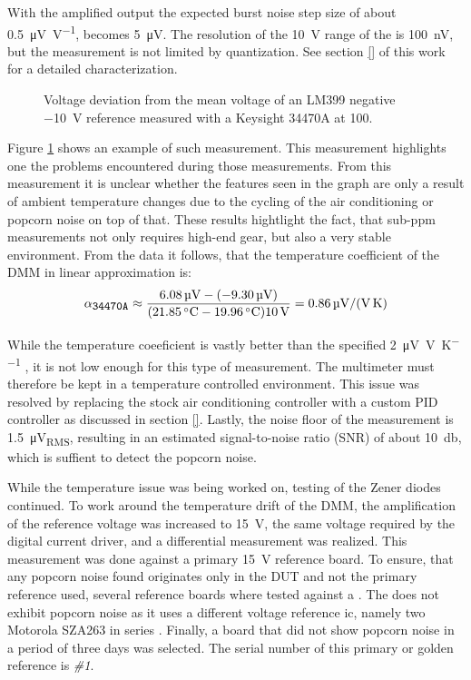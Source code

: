 With the amplified output the expected burst noise step size of about \qty[per-mode=symbol]{0.5}{\micro\volt \per \volt}, becomes \qty{5}{\micro\volt}. The resolution of the \qty{10}{\volt} range of the  is \qty{100}{\nano \volt}, but the measurement is not limited by quantization. See section \ref{} of this work for a detailed characterization.

\begin{figure}[ht]
    \centering
    
    \caption{Voltage deviation from the mean voltage of an LM399 negative \qty{-10}{\volt} reference measured with a Keysight 34470A at \qty{100}{\plc}.}
    \label{fig:lm399_vs_34470a}
\end{figure}

Figure \ref{fig:lm399_vs_34470a} shows an example of such measurement. This measurement highlights one the problems encountered during those measurements. From this measurement it is unclear whether the features seen in the graph are only a result of ambient temperature changes due to the cycling of the air conditioning or popcorn noise on top of that. These results hightlight the fact, that sub-\unit{ppm} measurements not only requires high-end gear, but also a very stable environment. From the data it follows, that the temperature coefficient of the DMM in linear approximation is:
\begin{equation}
    \alpha_{\texttt{\small 34470A}} \approx \frac{\qty{6.08}{\micro\volt}-(-\qty{9.30}{\micro\volt})}{(\qty{21.85}{\celsius}-\qty{19.96}{\celsius})\qty{10}{\volt}} = \qty[per-mode=symbol]{0.86}{\micro\volt \per \volt \per \kelvin}
\end{equation}

While the temperature coeeficient is vastly better than the specified \qty[per-mode=symbol]{2}{\micro\volt \per \volt \per \kelvin} \cite{datasheet_keysight34470A}, it is not low enough for this type of measurement. The multimeter must therefore be kept in a temperature controlled environment. This issue was resolved by replacing the stock air conditioning controller with a custom PID controller as discussed in section \ref{}. Lastly, the noise floor of the measurement is \qty{1.5}{\micro\volt_{RMS}}, resulting in an estimated signal-to-noise ratio (SNR) of about \qty{10}{\decibel}, which is suffient to detect the popcorn noise.

While the temperature issue was being worked on, testing of the Zener diodes continued. To work around the temperature drift of the DMM, the amplification of the reference voltage was increased to \qty{15}{\volt}, the same voltage required by the digital current driver, and a differential measurement was realized. This measurement was done against a primary \qty{15}{\volt} reference board. To ensure, that any popcorn noise found originates only in the DUT and not the primary reference used, several reference boards where tested against a . The  does not exhibit popcorn noise as it uses a different voltage reference ic, namely two Motorola SZA263 in series \cite{service_manual_fluke_5440b}. Finally, a board that did not show popcorn noise in a period of three days was selected. The serial number of this primary or golden reference is \textit{\#1}.

